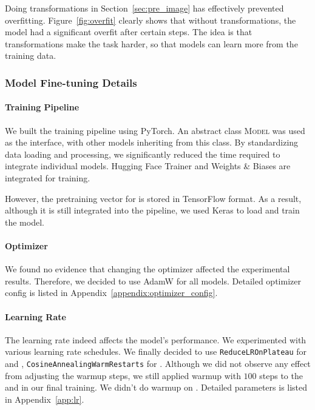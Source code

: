 Doing transformations in Section~\ref{sec:pre_image} has effectively prevented overfitting. Figure~\ref{fig:overfit} clearly shows that without transformations, the model had a significant overfit after certain steps. The idea is that transformations make the task harder, so that models can learn more from the training data.

\subsubsection{Model Fine-tuning Details}\label{sec:finetuning_details}

\paragraph{Training Pipeline} We built the training pipeline using PyTorch. An abstract class \textsc{Model} was used as the interface, with other models inheriting from this class. By standardizing data loading and processing, we significantly reduced the time required to integrate individual models. Hugging Face Trainer \cite{wolf-etal-2020-transformers} and Weights \& Biases \cite{wandb_docs_2024} are integrated for training.

However, the pretraining vector for \CROP is stored in TensorFlow format. As a result, although it is still integrated into the pipeline, we used Keras to load and train the model.

\paragraph{Optimizer} We found no evidence that changing the optimizer affected the experimental results. Therefore, we decided to use AdamW \cite{loshchilov2019decoupledweightdecayregularization} for all models. Detailed optimizer config is listed in Appendix~\ref{appendix:optimizer_config}.

\paragraph{Learning Rate} The learning rate indeed affects the model's performance. We experimented with various learning rate schedules. We finally decided to use \texttt{ReduceLROnPlateau} for \VIT and \CROP, \texttt{CosineAnnealingWarmRestarts} \cite{loshchilov2016sgdr} for \CONV. Although we did not observe any effect from adjusting the warmup \cite{goyal2017accurate} steps, we still applied warmup with $100$ steps to the \CONV and \VIT in our final training. We didn't do warmup on \CROP. Detailed parameters is listed in Appendix~\ref{app:lr}.

